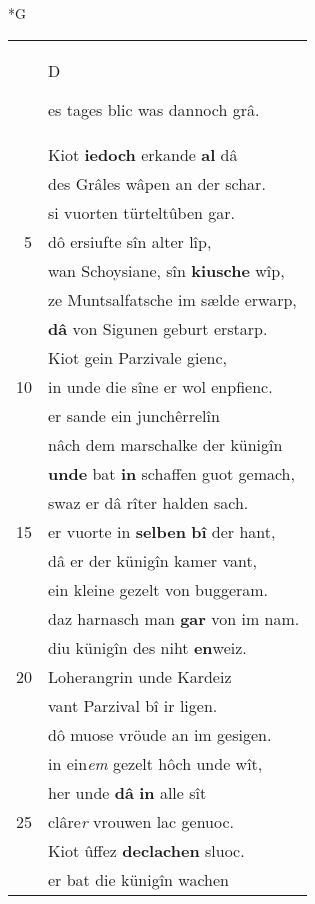 \documentclass[8pt,a4paper,notitlepage]{article}
\begin{document}
\begin{table}[ht]
\begin{minipage}[t]{0.5\linewidth}
\small
\begin{center}*G
\end{center}
\begin{tabular}{rl}
 & \begin{large}D\end{large}es tages blic was dannoch grâ.\\ 
 & Kiot \textbf{iedoch} erkande \textbf{al} dâ\\ 
 & des Grâles wâpen an der schar.\\ 
 & si vuorten türteltûben gar.\\ 
5 & dô ersiufte sîn alter lîp,\\ 
 & wan Schoysiane, sîn \textbf{kiusche} wîp,\\ 
 & ze Muntsalfatsche im sælde erwarp,\\ 
 & \textbf{dâ} von Sigunen geburt erstarp.\\ 
 & Kiot gein Parzivale gienc,\\ 
10 & in unde die sîne er wol enpfienc.\\ 
 & er sande ein junchêrrelîn\\ 
 & nâch dem marschalke der künigîn\\ 
 & \textbf{unde} bat \textbf{in} schaffen guot gemach,\\ 
 & swaz er dâ rîter halden sach.\\ 
15 & er vuorte in \textbf{selben} \textbf{bî} der hant,\\ 
 & dâ er der künigîn kamer vant,\\ 
 & ein kleine gezelt von buggeram.\\ 
 & daz harnasch man \textbf{gar} von im nam.\\ 
 & diu künigîn des niht \textbf{en}weiz.\\ 
20 & Loherangrin unde Kardeiz\\ 
 & vant Parzival bî ir ligen.\\ 
 & dô muose vröude an im gesigen.\\ 
 & in ein\textit{em} gezelt hôch unde wît,\\ 
 & her unde \textbf{dâ} \textbf{in} alle sît\\ 
25 & clâre\textit{r} vrouwen lac genuoc.\\ 
 & Kiot ûffez \textbf{declachen} sluoc.\\ 
 & er bat die künigîn wachen\\ 

\end{tabular}
\end{minipage}
\end{table}
\end{document}

